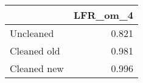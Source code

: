 \begin{tabular}{lr}
\toprule
{} & LFR_om_4 \\
\midrule
Uncleaned   &    0.821 \\
Cleaned old &    0.981 \\
Cleaned new &    0.996 \\
\bottomrule
\end{tabular}
